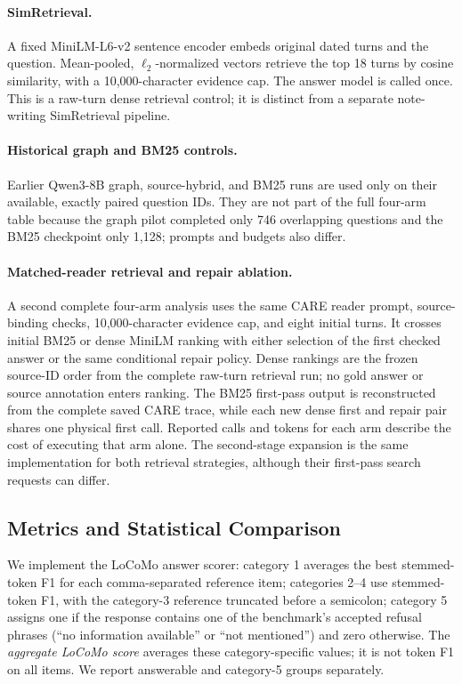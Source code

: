\documentclass[11pt]{article}
\newcommand{\care}{\textsc{CARE}}
\begin{document}
\paragraph{SimRetrieval.} A fixed MiniLM-L6-v2 sentence encoder embeds original
dated turns and the question. Mean-pooled, $\ell_2$-normalized vectors
retrieve the top 18 turns by cosine similarity, with a 10,000-character
evidence cap. The answer model is called once. This is a raw-turn dense
retrieval control; it is distinct from a separate note-writing
SimRetrieval pipeline.

\paragraph{Historical graph and BM25 controls.} Earlier Qwen3-8B graph,
source-hybrid, and BM25 runs are used only on their available, exactly
paired question IDs. They are not part of the full four-arm table because
the graph pilot completed only 746 overlapping questions and the BM25
checkpoint only 1,128; prompts and budgets also differ.

\paragraph{Matched-reader retrieval and repair ablation.} A second complete
four-arm analysis uses the same \care{} reader prompt, source-binding checks,
10,000-character evidence cap, and eight initial turns. It crosses initial
BM25 or dense MiniLM ranking with either selection of the first checked
answer or the same conditional repair policy. Dense rankings are the frozen
source-ID order from the complete raw-turn retrieval run; no gold answer or
source annotation enters ranking. The BM25 first-pass output is reconstructed
from the complete saved \care{} trace, while each new dense first and repair
pair shares one physical first call. Reported calls and tokens for each arm
describe the cost of executing that arm alone. The second-stage expansion is
the same implementation for both retrieval strategies, although their
first-pass search requests can differ.

\subsection{Metrics and Statistical Comparison}

We implement the LoCoMo answer scorer: category 1 averages the best
stemmed-token F1 for each comma-separated reference item; categories 2--4
use stemmed-token F1, with the category-3 reference truncated before a
semicolon; category 5 assigns one if the response contains one of the
benchmark's accepted refusal phrases (``no information available'' or
``not mentioned'') and zero otherwise. The \emph{aggregate LoCoMo score}
averages these category-specific values; it is not token F1 on all items.
We report answerable and category-5 groups separately.
\end{document}
